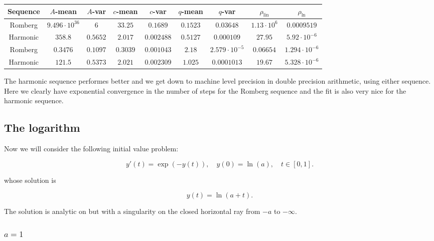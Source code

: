 \begin{table}[H]
    \centering
    \small
    \begin{tabular}{c||c|c|c|c|c|c|c|c}
Sequence & \(A\)-mean & \(A\)-var & \(c\)-mean & \(c\)-var & \(q\)-mean & \(q\)-var & \(\rho_{\operatorname{lin}}\) & \(\rho_{\ln}\)\\\hline
\rowcolor{red}
Romberg & \(9.496\cdot 10^{36}\) & \(6\) & \(33.25\) & \(0.1689\) & \(0.1523\) & \(0.03648\) & \(1.13\cdot 10^6\) & \(0.0009519\) \\
\rowcolor{green}
Harmonic & \(358.8\) & \(0.5652\) & \(2.017\) & \(0.002488\) & \(0.5127\) & \(0.000109\) & \(27.95\) & \(5.92\cdot 10^{-6}\) \\
\rowcolor{green}
Romberg & \(0.3476\) & \(0.1097\) & \(0.3039\) & \(0.001043\) & \(2.18\) & \(2.579\cdot 10^{-5}\) & \(0.06654\) & \(1.294\cdot 10^{-6}\) \\
\rowcolor{green}
Harmonic & \(121.5\) & \(0.5373\) & \(2.021\) & \(0.002309\) & \(1.025\) & \(0.0001013\) & \(19.67\) & \(5.328\cdot 10^{-6}\) \\
    \end{tabular}
    \label{tab:my_label}
\end{table}

The harmonic sequence performes better and we get down to machine level precision in double precision arithmetic, using either sequence.\\

Here we clearly have exponential convergence in the number of steps for the Romberg sequence and the fit is also very nice for the harmonic sequence.

\subsection{The logarithm}

Now we will consider the following initial value problem:

\begin{equation}
y'(t) = \exp(-y(t)), \quad y(0) = \ln(a), \quad t\in [0,1].
\end{equation}

whose solution is 

\[
y(t) = \ln(a + t).
\]

The solution is analytic on but with a singularity on the closed horizontal ray from \(-a\) to \(-\infty\).

\subsubsection{\(a = 1\)}

